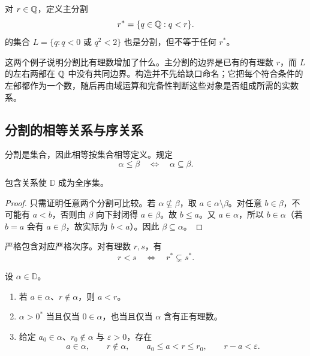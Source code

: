 对 \(r\in\mathbb{Q}\)，定义主分割
\[
 r^*=\{q\in\mathbb{Q}:q<r\}.
\]
的集合 \(L=\{q:q<0\text{ 或 }q^2<2\}\) 也是分割，但不等于任何 \(r^*\)。

这两个例子说明分割比有理数增加了什么。主分割的边界是已有的有理数 \(r\)，而 \(L\) 的左右两部在 \(\mathbb{Q}\) 中没有共同边界。构造并不先给缺口命名；它把每个符合条件的左部都作为一个数，随后再由域运算和完备性判断这些对象是否组成所需的实数系。

\subsection{分割的相等关系与序关系}


分割是集合，因此相等按集合相等定义。规定
\[
 \alpha\le\beta\quad\Longleftrightarrow\quad\alpha\subseteq\beta.
\]

\begin{proposition}
包含关系使 \(\mathbb D\) 成为全序集。
\end{proposition}

\begin{proof}
只需证明任意两个分割可比较。若 \(\alpha\nsubseteq\beta\)，取 \(a\in\alpha\setminus\beta\)。对任意 \(b\in\beta\)，不可能有 \(a<b\)，否则由 \(\beta\) 向下封闭得 \(a\in\beta\)。故 \(b\le a\)。又 \(a\in\alpha\)，所以 \(b\in\alpha\)（若 \(b=a\) 会有 \(a\in\beta\)，故实际为 \(b<a\)）。因此 \(\beta\subseteq\alpha\)。
\end{proof}

严格包含对应严格次序。对有理数 \(r,s\)，有
\[
 r<s\quad\Longleftrightarrow\quad r^*\subsetneq s^*.
\]

\begin{proposition}[分割的基本性质]
设 \(\alpha\in\mathbb D\)。
\begin{enumerate}
 \item 若 \(a\in\alpha\)、\(r\notin\alpha\)，则 \(a<r\)。
 \item \(\alpha>0^*\) 当且仅当 \(0\in\alpha\)，也当且仅当 \(\alpha\) 含有正有理数。
 \item 给定 \(a_0\in\alpha\)、\(r_0\notin\alpha\) 与 \(\varepsilon>0\)，存在
 \[
   a\in\alpha,\qquad r\notin\alpha,
   \qquad a_0\le a<r\le r_0,\qquad r-a<\varepsilon.
 \]
\end{enumerate}
\end{proposition}

